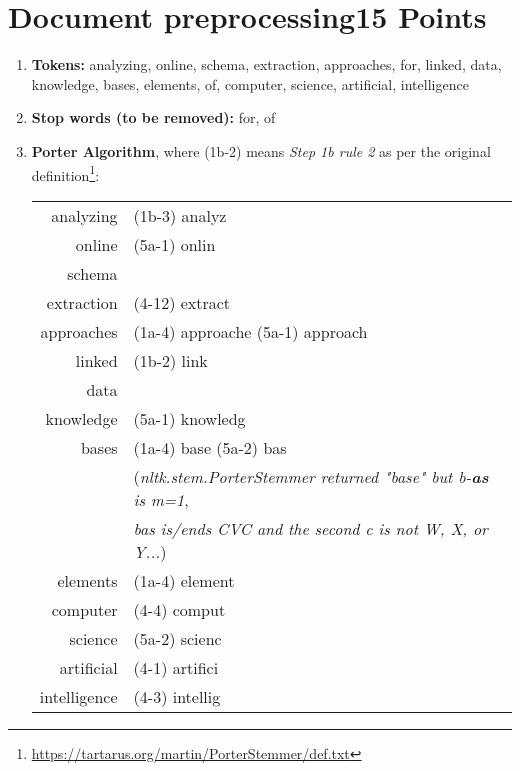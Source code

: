 \documentclass[10pt,a4paper]{article}
\begin{document}
\section{\hfill Document preprocessing\hfill 15 Points}
\begin{enumerate}
    \item \textbf{Tokens:} analyzing, online, schema, extraction, approaches, for, linked, data, knowledge, bases, elements, of, computer, science, artificial, intelligence
    \item \textbf{Stop words (to be removed):} for, of
    \item \textbf{Porter Algorithm}, where (1b-2) means \textit{Step 1b rule 2} as per the original definition\footnote{\url{https://tartarus.org/martin/PorterStemmer/def.txt}}:
    
        \begin{tabular}{r|l}
            analyzing&(1b-3) analyz\\
            online&(5a-1) onlin\\
            schema&\\
            extraction&(4-12) extract\\
            approaches&(1a-4) approache (5a-1) approach\\
            linked&(1b-2) link\\
            data&\\
            knowledge&(5a-1) knowledg\\
            bases&(1a-4) base (5a-2) bas\\
                &(\textit{nltk.stem.PorterStemmer returned "base" but b-\textbf{as} is m=1},\\
                &\textit{bas is/ends CVC and the second c is not W, X, or Y...})\\
            elements&(1a-4) element \\
            computer&(4-4) comput\\
            science&(5a-2) scienc\\
            artificial&(4-1) artifici\\
            intelligence&(4-3) intellig
        \end{tabular}
\end{enumerate}
\end{document}
